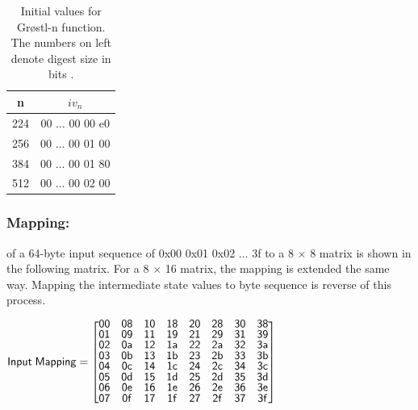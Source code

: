   \begin{table}
    \begin{center}
      \begin{tabular}{ *{2}{c} } \hline
        n   & $iv_{n}$         \\ \hline
        224 & 00 $\dots$ 00 00 e0 \\
        256 & 00 $\dots$ 00 01 00 \\
        384 & 00 $\dots$ 00 01 80 \\
        512 & 00 $\dots$ 00 02 00 \\ \hline
      \end{tabular}
    \caption{Initial values for Gr{\o}stl-n function. The numbers on left denote digest size in bits \cite{00019}.}
    \end{center}
  \end{table}

\newpage
    \subsubsection{Mapping:} of a 64-byte input sequence of 0x00 0x01 0x02 $\ldots$ 3f to a 8 $\times$ 8 matrix is shown 
    in the following matrix. For a 8 $\times$ 16 matrix, the mapping is extended the same way. Mapping the intermediate 
    state values to byte sequence is reverse of this process.
     \begin{center}$\mathsf{Input\thickspace Mapping} = \renewcommand\arraystretch{0.75}
      \begin{bmatrix}
        \mathsf{00} & \mathsf{08} & \mathsf{10} & \mathsf{18} & \mathsf{20} & \mathsf{28} & \mathsf{30} & \mathsf{38} \\
        \mathsf{01} & \mathsf{09} & \mathsf{11} & \mathsf{19} & \mathsf{21} & \mathsf{29} & \mathsf{31} & \mathsf{39} \\
        \mathsf{02} & \mathsf{0a} & \mathsf{12} & \mathsf{1a} & \mathsf{22} & \mathsf{2a} & \mathsf{32} & \mathsf{3a} \\
        \mathsf{03} & \mathsf{0b} & \mathsf{13} & \mathsf{1b} & \mathsf{23} & \mathsf{2b} & \mathsf{33} & \mathsf{3b} \\
        \mathsf{04} & \mathsf{0c} & \mathsf{14} & \mathsf{1c} & \mathsf{24} & \mathsf{2c} & \mathsf{34} & \mathsf{3c} \\
        \mathsf{05} & \mathsf{0d} & \mathsf{15} & \mathsf{1d} & \mathsf{25} & \mathsf{2d} & \mathsf{35} & \mathsf{3d} \\
        \mathsf{06} & \mathsf{0e} & \mathsf{16} & \mathsf{1e} & \mathsf{26} & \mathsf{2e} & \mathsf{36} & \mathsf{3e} \\
        \mathsf{07} & \mathsf{0f} & \mathsf{17} & \mathsf{1f} & \mathsf{27} & \mathsf{2f} & \mathsf{37} & \mathsf{3f}
      \end{bmatrix}$\end{center}
      
